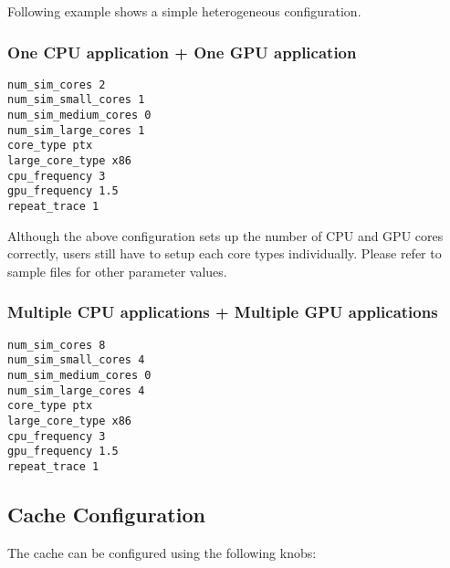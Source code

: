 \noindent Following example shows a simple heterogeneous configuration.

\subsubsection*{One CPU application + One GPU application}

\begin{Verbatim}
num_sim_cores 2
num_sim_small_cores 1
num_sim_medium_cores 0
num_sim_large_cores 1
core_type ptx
large_core_type x86
cpu_frequency 3
gpu_frequency 1.5
repeat_trace 1
\end{Verbatim}


Although the above configuration sets up the number of CPU and GPU cores
correctly, users still have to setup each core types individually. Please refer
to sample files for other parameter values.

\subsubsection*{Multiple CPU applications + Multiple GPU applications}

\begin{Verbatim}
num_sim_cores 8
num_sim_small_cores 4
num_sim_medium_cores 0
num_sim_large_cores 4
core_type ptx
large_core_type x86
cpu_frequency 3
gpu_frequency 1.5
repeat_trace 1
\end{Verbatim}



\subsection{Cache Configuration}
\label{sec:knob:cache}

The cache can be configured using the following knobs:

